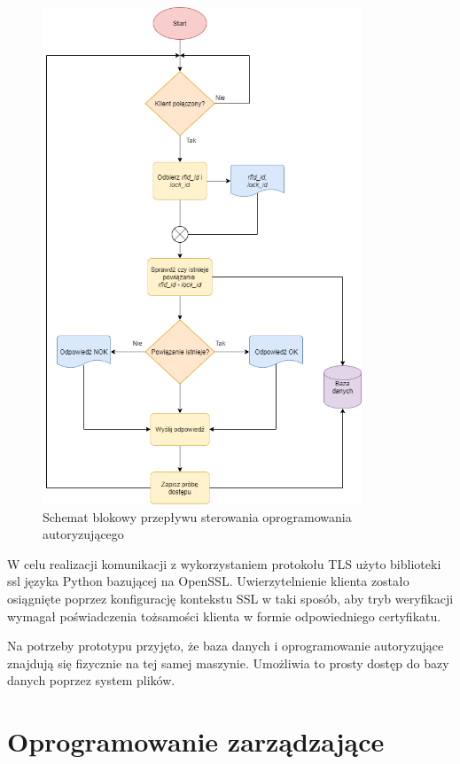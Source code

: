     	\begin{figure}[]
            \centering
            \includegraphics[width=0.85\textwidth]{chapters/images/flowchart5.png}
            \caption{Schemat blokowy przepływu sterowania oprogramowania autoryzującego}
            \label{fig:flowchart5}
        \end{figure}

    	W celu realizacji komunikacji z wykorzystaniem protokołu TLS użyto biblioteki ssl języka Python bazującej na OpenSSL. Uwierzytelnienie klienta zostało osiągnięte poprzez konfigurację kontekstu SSL w taki sposób, aby tryb weryfikacji wymagał poświadczenia tożsamości klienta w formie odpowiedniego certyfikatu.

    	Na potrzeby prototypu przyjęto, że baza danych i oprogramowanie autoryzujące znajdują się fizycznie na tej samej maszynie. Umożliwia to prosty dostęp do bazy danych poprzez system plików.

    \section{Oprogramowanie zarządzające}

